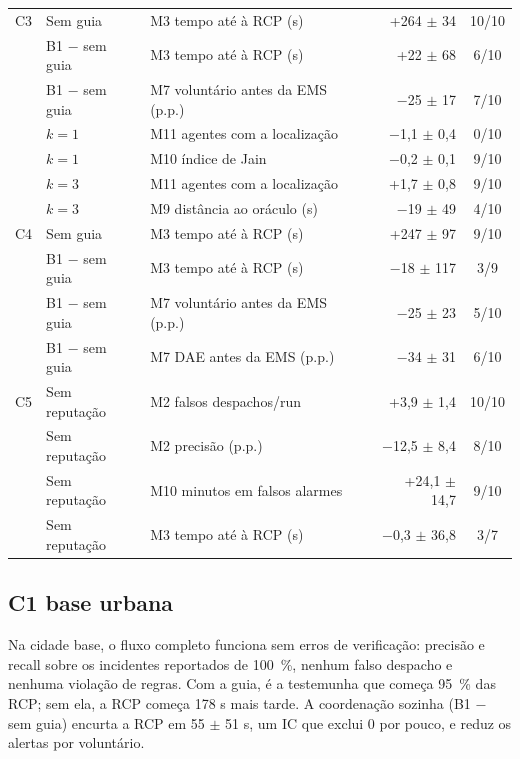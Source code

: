 \documentclass[11pt,a4paper]{article}
\begin{document}
\begin{table}[htbp]
\begin{tabularx}{\textwidth}{llLrc}
\addlinespace
C3 & Sem guia & M3 tempo até à RCP (s) & +264 $\pm$ 34 & 10/10 \\
   & B1 $-$ sem guia & M3 tempo até à RCP (s) & +22 $\pm$ 68 & 6/10 \\
   & B1 $-$ sem guia & M7 voluntário antes da EMS (p.p.) & $-$25 $\pm$ 17 & 7/10 \\
   & $k = 1$ & M11 agentes com a localização & $-$1,1 $\pm$ 0,4 & 0/10 \\
   & $k = 1$ & M10 índice de Jain & $-$0,2 $\pm$ 0,1 & 9/10 \\
   & $k = 3$ & M11 agentes com a localização & +1,7 $\pm$ 0,8 & 9/10 \\
   & $k = 3$ & M9 distância ao oráculo (s) & $-$19 $\pm$ 49 & 4/10 \\
\addlinespace
C4 & Sem guia & M3 tempo até à RCP (s) & +247 $\pm$ 97 & 9/10 \\
   & B1 $-$ sem guia & M3 tempo até à RCP (s) & $-$18 $\pm$ 117 & 3/9 \\
   & B1 $-$ sem guia & M7 voluntário antes da EMS (p.p.) & $-$25 $\pm$ 23 & 5/10 \\
   & B1 $-$ sem guia & M7 DAE antes da EMS (p.p.) & $-$34 $\pm$ 31 & 6/10 \\
\addlinespace
C5 & Sem reputação & M2 falsos despachos/run & +3,9 $\pm$ 1,4 & 10/10 \\
   & Sem reputação & M2 precisão (p.p.) & $-$12,5 $\pm$ 8,4 & 8/10 \\
   & Sem reputação & M10 minutos em falsos alarmes & +24,1 $\pm$ 14,7 & 9/10 \\
   & Sem reputação & M3 tempo até à RCP (s) & $-$0,3 $\pm$ 36,8 & 3/7 \\
\bottomrule
\end{tabularx}
\end{table}

\FloatBarrier
\subsection{C1 base urbana}

Na cidade base, o fluxo completo funciona sem erros de verificação: precisão e recall sobre os incidentes reportados de 100~\%, nenhum falso despacho e nenhuma violação de regras. Com a guia, é a testemunha que começa 95~\% das RCP; sem ela, a RCP começa 178 s mais tarde. A coordenação sozinha (B1 $-$ sem guia) encurta a RCP em 55 $\pm$ 51 s, um IC que exclui 0 por pouco, e reduz os alertas por voluntário.
\end{document}
